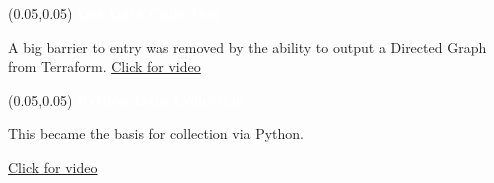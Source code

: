 \documentclass[aspectratio=169]{beamer} %
\begin{document}
\begin{frame}{}
    \setlength{\TPHorizModule}{\textwidth}
    \setlength{\TPVertModule}{\textwidth}
    \begin{textblock}{0.74}(0.05,0.05)
        \bfseries\large\textcolor{white}{Dot Data Collection}
    \end{textblock}
    A big barrier to entry was removed by the ability to output
    a Directed Graph from Terraform. \href{https://youtu.be/2FytVBJHUKk}{Click for video}

    \lstI

\end{frame}

\begin{frame}{}
    \setlength{\TPHorizModule}{\textwidth}
    \setlength{\TPVertModule}{\textwidth}
    \begin{textblock}{0.74}(0.05,0.05)
        \bfseries\large\textcolor{white}{Python Data Collection}
    \end{textblock}
    This became the basis for collection via Python.

    \href{https://youtu.be/aTE8uZVO248}{Click for video} %
\end{frame}
\end{document}

